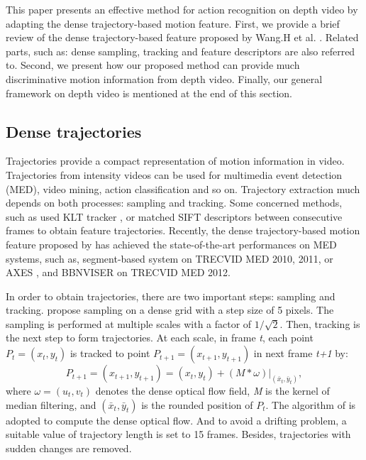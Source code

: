 \documentclass[final,3p,times,twocolumn]{elsarticle}
\begin{document}
This paper presents an effective method for action recognition on depth video by adapting the dense trajectory-based motion feature. First, we provide a brief review of the dense trajectory-based feature proposed by Wang.H et al. \cite{wang2011densetraj}. Related parts, such as: dense sampling, tracking and feature descriptors are also referred to. Second, we present how our proposed method can provide much discriminative motion information from depth video. Finally, our general framework on depth video is mentioned at the end of this section.

\subsection{Dense trajectories}
Trajectories provide a compact representation of motion information in video.
Trajectories from intensity videos can be used for multimedia event detection (MED), video mining, action classification and so on.
Trajectory extraction much depends on both processes: sampling and tracking.
Some concerned methods, such as \cite{matikainen2009trajectons, messing2009activity} used KLT tracker \cite{lucas1981iterative}, or \cite{sun2009hierarchical} matched SIFT descriptors between consecutive frames to obtain feature trajectories.
Recently, the dense trajectory-based motion feature proposed by \cite{wang2011densetraj} has achieved the state-of-the-art performances on MED systems, such as, segment-based system \cite{phan2014multimedia} on TRECVID MED 2010, 2011, or AXES \cite{oneata2012axes}, and BBNVISER \cite{natarajan2012bbn} on TRECVID MED 2012.

In order to obtain trajectories, there are two important steps: sampling and tracking. \cite{wang2011densetraj} propose sampling on a dense grid with a step size of 5 pixels. The sampling is performed at multiple scales with a factor of $1/\sqrt{2}$. Then, tracking is the next step to form trajectories. At each scale, in frame \textit{t}, each point \textit{$P_t = (x_t, y_t)$} is tracked to point \textit{$P_{t+1} = (x_{t+1}, y_{t+1})$} in next frame \textit{t+1} by:
\begin{equation}
	\textit{$P_{t+1} = (x_{t+1}, y_{t+1}) = (x_t, y_t) + (M*\omega)|_{(\bar{x}_t,\bar{y}_t)} $},
\end{equation}
where \textit{$\omega = (u_t, v_t)$} denotes the dense optical flow field, \textit{M} is the kernel of median filtering, and \textit{$(\bar{x}_t,\bar{y}_t)$} is the rounded position of \textit{$P_t$}. The algorithm of \cite{farneback2003two} is adopted to compute the dense optical flow. And to avoid a drifting problem, a suitable value of trajectory length is set to 15 frames. Besides, trajectories with sudden changes are removed.
\end{document}
